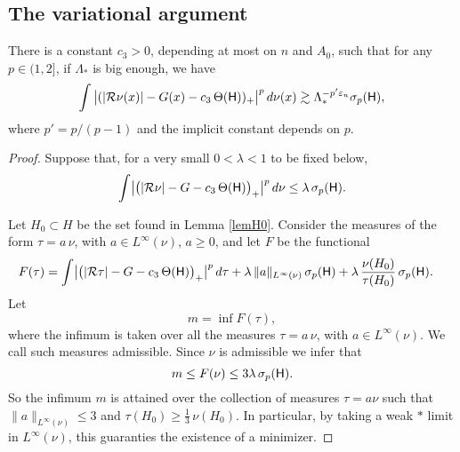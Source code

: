 \subsection{The variational argument}


\begin{lemma}\label{lemvar}
There is a constant $c_3>0$, depending at most on $n$ and $A_0$, such that for any $p\in (1,2]$, if $\Lambda_*$ is big enough, we have
$$\int \big|(|{\mathcal R}\nu(x)| - G(x)- c_3\,\Theta({\mathsf{H}}))_+\big|^p\,d\nu(x) \gtrsim \Lambda_*^{-p'{\varepsilon}_n}\sigma_p({\mathsf{H}}),$$
where $p'=p/(p-1)$ and the implicit constant depends on $p$.
\end{lemma}


\begin{proof}
Suppose that, for a very small $0<\lambda<1$ to be fixed below,
\begin{equation}\label{eqsupp1}
\int \bigl|\bigl(|{\mathcal R}\nu| - G - c_3\,\Theta({\mathsf{H}})\bigr)_+\bigr|^p\,d\nu\leq \lambda\,\sigma_p({\mathsf{H}}).
\end{equation}



Let $H_0\subset H$ be the set found in Lemma \ref{lemH0}.
 Consider the measures of the form
$\tau=a\,\nu$, with $a\in L^\infty(\nu)$, $a\geq 0$, and let $F$ be the functional
\begin{align*}\label{e.functional}
F(\tau) & = 
\int \bigl|\bigl(|{\mathcal R}\tau| - G- c_3\,\Theta({\mathsf{H}})\bigr)_+\bigr|^p\,d\tau
 + \lambda\,\|a\|_{L^\infty(\nu)} \,\sigma_p({\mathsf{H}}) + \lambda \,\frac{\nu(H_0)}{\tau(H_0)}\,\sigma_p({\mathsf{H}}).\nonumber
\end{align*}
Let
$$m= \inf F(\tau),$$ where the infimum is taken over all the measures $\tau=a\,\nu$, with $a\in L^\infty(\nu)$. We call such measures admissible. 
Since $\nu$ is admissible we infer that
\begin{equation}
\label{e.admis}
m \leq F(\nu) \leq 3\lambda\,\sigma_p({\mathsf{H}}).
\end{equation}
So the infimum $m$ is attained over the collection of
measures $\tau=a\nu$ such that $\|a\|_{L^\infty(\nu)}\leq 3$ and $
\tau(H_0)\geq\frac13\,\nu(H_0)$. In particular, by taking a weak $*$ limit in $L^\infty(\nu)$, this guaranties
the existence of a minimizer.


\end{proof}
